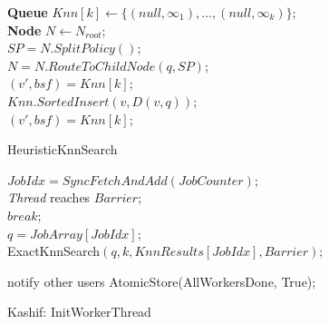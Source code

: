 \begin{algorithm}
	\DontPrintSemicolon
	\vspace{.2cm}
	\textbf{Queue} $Knn[k] \gets \{(null, \infty_{1}), ..., (null, \infty_{k})\}$;\\
	\textbf{Node} $N \gets N_{root}$;\\
	{
		$SP = N.SplitPolicy()$;\\
		$N = N.RouteToChildNode(q, SP)$;\\
		
	}
	\vspace{.1cm}
	$(v', bsf) = Knn[k]$;\\
	{
		{
			$Knn.SortedInsert(v, D(v, q))$;\\
		}
		$(v', bsf) = Knn[k]$;\\
	}


	\caption{{\sc HeuristicKnnSearch}}
	\label{algo:heuristic_knn_search}
\end{algorithm}



\small
\begin{algorithm}
	\DontPrintSemicolon %
	\vspace{.2cm}
	
	{
		$JobIdx = SyncFetchAndAdd(JobCounter)$;\\
		
		{
			{
				{\it Thread} reaches $Barrier$; \\
			}
			$break$; \\
		}
		$q = JobArray[JobIdx]$;\\
	 	{\sc ExactKnnSearch$(q, k, KnnResults[JobIdx], Barrier)$};
	 	
	 	{
	 		 notify other users
	 		AtomicStore(AllWorkersDone, True);\\
	 	}
	}
	
	\caption{{\sc Kashif: InitWorkerThread}}
	\label{algo:init_thread}
\end{algorithm}


